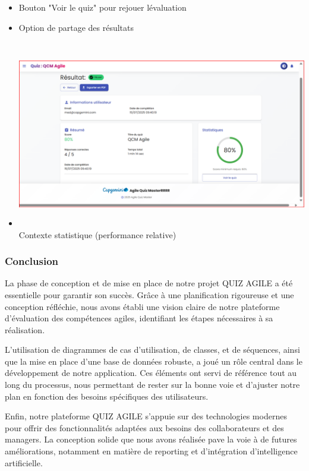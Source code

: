 \documentclass[12pt,a4paper,twoside,openright]{report}
\begin{document}
\begin{enumerate}
  \begin{itemize}
  \item
    Bouton "Voir le quiz" pour rejouer l\textquotesingle évaluation
  \item
    Option de partage des résultats
  \item
    \includegraphics[width=6.3in,height=3.23681in]{latex_media/media/image65.png}Contexte
    statistique (performance relative)
  \end{itemize}
\end{enumerate}

\hypertarget{conclusion-4}{%
\subsubsection{Conclusion}\label{conclusion-4}}

La phase de conception et de mise en place de notre projet QUIZ AGILE a
été essentielle pour garantir son succès. Grâce à une planification
rigoureuse et une conception réfléchie, nous avons établi une vision
claire de notre plateforme d'évaluation des compétences agiles,
identifiant les étapes nécessaires à sa réalisation.

L'utilisation de diagrammes de cas d'utilisation, de classes, et de
séquences, ainsi que la mise en place d'une base de données robuste, a
joué un rôle central dans le développement de notre application. Ces
éléments ont servi de référence tout au long du processus, nous
permettant de rester sur la bonne voie et d'ajuster notre plan en
fonction des besoins spécifiques des utilisateurs.

Enfin, notre plateforme QUIZ AGILE s'appuie sur des technologies
modernes pour offrir des fonctionnalités adaptées aux besoins des
collaborateurs et des managers. La conception solide que nous avons
réalisée pave la voie à de futures améliorations, notamment en matière
de reporting et d'intégration d'intelligence artificielle.
\end{document}
